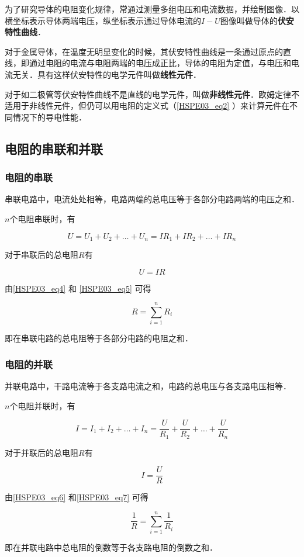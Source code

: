 为了研究导体的电阻变化规律，常通过测量多组电压和电流数据，并绘制图像．以横坐标表示导体两端电压，纵坐标表示通过导体电流的$I-U$图像叫做导体的\textbf{伏安特性曲线}．

对于金属导体，在温度无明显变化的时候，其伏安特性曲线是一条通过原点的直线，即通过电阻的电流与电阻两端的电压成正比，导体的电阻为定值，与电压和电流无关．具有这样伏安特性的电学元件叫做\textbf{线性元件}．

对于如二极管等伏安特性曲线不是直线的电学元件，叫做\textbf{非线性元件}．欧姆定律不适用于非线性元件，但仍可以用电阻的定义式（\autoref{HSPE03_eq2} ）来计算元件在不同情况下的导电性能．

\subsection{电阻的串联和并联}

\subsubsection{电阻的串联}

串联电路中，电流处处相等，电路两端的总电压等于各部分电路两端的电压之和．

$n$个电阻串联时，有

\begin{equation}\label{HSPE03_eq4}
U=U_1+U_2+\dots +U_n=IR_1+IR_2+\dots +IR_n
\end{equation}

对于串联后的总电阻$R$有

\begin{equation}\label{HSPE03_eq5}
U=IR
\end{equation}

由\autoref{HSPE03_eq4} 和 \autoref{HSPE03_eq5} 可得

\begin{equation}
R=\sum_{i=1}^{n}R_i
\end{equation}

即在串联电路的总电阻等于各部分电路的电阻之和．

\subsubsection{电阻的并联}

并联电路中，干路电流等于各支路电流之和，电路的总电压与各支路电压相等．

$n$个电阻并联时，有

\begin{equation}\label{HSPE03_eq6}
I=I_1+I_2+\dots +I_n=\frac{U}{R_1}+\frac{U}{R_2}+\dots +\frac{U}{R_n}
\end{equation}

对于并联后的总电阻$R$有

\begin{equation}\label{HSPE03_eq7}
I=\frac{U}{R}
\end{equation}

由\autoref{HSPE03_eq6} 和\autoref{HSPE03_eq7} 可得

\begin{equation}
\frac{1}{R}=\sum_{i=1}^{n}\frac{1}{R_i}
\end{equation}

即在并联电路中总电阻的倒数等于各支路电阻的倒数之和．

